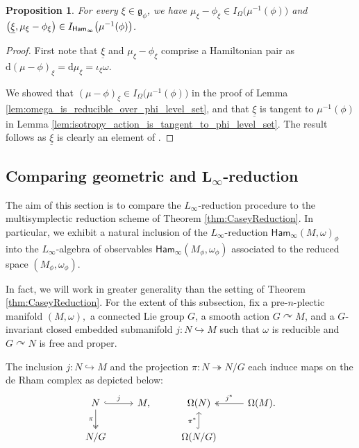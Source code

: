 \documentclass[pdftex]{sigma}
\numberwithin{equation}{section}
\newtheorem{Proposition}[Theorem]{Proposition}
 { \theoremstyle{definition}
\newtheorem{Definition}[Theorem]{Definition}
\newtheorem{Note}[Theorem]{Note}
\newtheorem{Example}[Theorem]{Example}
\newtheorem{Remark}[Theorem]{Remark} }
\newcommand{\g}{\mathfrak{g}}
\newcommand{\Ham}{\mathsf{Ham}}
\newcommand{\X}{\mathfrak{X}}
\renewcommand{\d}{\mathrm{d}}
\begin{document}
\begin{Proposition}%
	For every $\xi\in\g_\phi$, we have $\mu_\xi-\phi_\xi\in I_{\Omega}\bigl(\mu^{-1}(\phi)\bigr)$ and $\bigl(\underline\xi,\mu_\xi-\phi_\xi\bigr)\in \smash{I_{\Ham_\infty}\bigl(\mu^{-1}(\phi)\bigr)}$.
\end{Proposition}

\begin{proof}
	First note that $\underline\xi$ and $\mu_\xi-\phi_\xi$ comprise a Hamiltonian pair as $\d(\mu-\phi)_\xi = \d\mu_\xi = \iota_\xi\omega$.

	We showed that $(\mu-\phi)_\xi\in I_\Omega\bigl(\mu^{-1}(\phi)\bigr)$ in the proof of Lemma \ref{lem:omega_is_reducible_over_phi_level_set}, and that $\underline\xi$ is tangent to $\mu^{-1}(\phi)$ in Lemma \ref{lem:isotropy_action_is_tangent_to_phi_level_set}. The result follows as $\underline\xi$ is clearly an element of \smash{$\X_\g(M)+I_\X\bigl(\mu^{-1}(\phi)\bigr)$}.
\end{proof}


\subsection[Comparing geometric and L\_infty-reduction]{Comparing geometric and $\boldsymbol{L_\infty}$-reduction}%

The aim of this section is to compare the $L_\infty$-reduction procedure to the multisymplectic reduction scheme of Theorem \ref{thm:CaseyReduction}. In particular, we exhibit a natural inclusion of the $L_\infty$-reduction $\Ham_\infty(M,\omega)_\phi$ into the $L_\infty$-algebra of observables $\Ham_\infty(M_\phi,\omega_\phi)$ associated to the reduced space $(M_\phi,\omega_\phi)$.

In fact, we will work in greater generality than the setting of Theorem \ref{thm:CaseyReduction}. For the extent of this subsection, fix a pre-$n$-plectic manifold $(M,\omega),$ a connected Lie group $G$, a smooth action $G\curvearrowright M$, and a $G$-invariant closed embedded submanifold $j\colon N\hookrightarrow M$ such that $\omega$ is reducible and $G\curvearrowright N$ is free and proper.

The inclusion $j\colon N\hookrightarrow M$ and the projection $\pi\colon N\twoheadrightarrow N/G$ each induce maps on the de Rham complex as depicted below:
\[
	\begin{tikzcd}
		N \ar[r,hook,"j"] \ar[d,two heads,"\pi"'] & M,  & \Omega(N) & \Omega(M). \ar[l,two heads,"j^\ast"']
		\\
		N/G &   & \Omega(N/G) \ar[u,hook,"\pi^\ast"]
	\end{tikzcd}
\]
\end{document}
